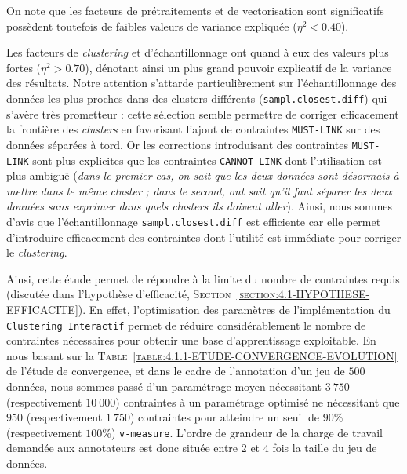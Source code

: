 			\begin{leftBarAuthorOpinion}
				On note que les facteurs de prétraitements et de vectorisation sont significatifs possèdent toutefois de faibles valeurs de variance expliquée ($\eta^{2} < 0.40$).
				
				Les facteurs de \textit{clustering} et d'échantillonnage ont quand à eux des valeurs plus fortes ($\eta^{2} > 0.70$), dénotant ainsi un plus grand pouvoir explicatif de la variance des résultats.
				Notre attention s'attarde particulièrement sur l'échantillonnage des données les plus proches dans des clusters différents (\texttt{sampl.closest.diff}) qui s'avère très prometteur : cette sélection semble permettre de corriger efficacement la frontière des \textit{clusters} en favorisant l'ajout de contraintes \texttt{MUST-LINK} sur des données séparées à tord.
				Or les corrections introduisant des contraintes \texttt{MUST-LINK} sont plus explicites que les contraintes \texttt{CANNOT-LINK} dont l'utilisation est plus ambiguë (\textit{dans le premier cas, on sait que les deux données sont désormais à mettre dans le même \textit{cluster} ; dans le second, ont sait qu'il faut séparer les deux données sans exprimer dans quels \textit{clusters} ils doivent aller}).
				Ainsi, nous sommes d'avis que l'échantillonnage \texttt{sampl.closest.diff} est efficiente car elle permet d'introduire efficacement des contraintes dont l'utilité est immédiate pour corriger le \textit{clustering}.
			\end{leftBarAuthorOpinion}

			Ainsi, cette étude permet de répondre à la limite du nombre de contraintes requis (discutée dans l'hypothèse d'efficacité, \textsc{Section~\ref{section:4.1-HYPOTHESE-EFFICACITE}}).
			En effet, l'optimisation des paramètres de l'implémentation du \texttt{Clustering Interactif} permet de réduire considérablement le nombre de contraintes nécessaires pour obtenir une base d'apprentissage exploitable.
			En nous basant sur la \textsc{Table~\ref{table:4.1.1-ETUDE-CONVERGENCE-EVOLUTION}} de l'étude de convergence, et dans le cadre de l'annotation d'un jeu de $500$ données, nous sommes passé d'un paramétrage moyen nécessitant $3~750$ (respectivement $10~000$) contraintes à un paramétrage optimisé ne nécessitant que $950$ (respectivement $1~750$) contraintes pour atteindre un seuil de $90$\% (respectivement $100$\%) \texttt{v-measure}.
			L'ordre de grandeur de la charge de travail demandée aux annotateurs est donc située entre $2$ et $4$ fois la taille du jeu de données.
			
